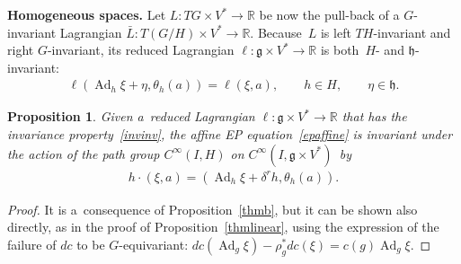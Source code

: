 \documentclass[pdftex]{sigma}
\numberwithin{equation}{section}
\newtheorem{Proposition}[Theorem]{Proposition}
{ \theoremstyle{definition}
\newtheorem{Example}[Theorem]{Example}
\newtheorem{Remark}[Theorem]{Remark} }
\begin{document}
{\bf Homogeneous spaces.} Let $L:TG\times V^*\to\mathbb R$ be now the pull-back of a $G$-invariant Lagrangian $\bar
L:T(G/H)\times V^*\to\mathbb R$.
Because~$L$ is left $TH$-invariant and right $G$-invariant, its reduced Lagrangian $\ell:\mathfrak g\times V^*\to\mathbb
R$ is both~$H$- and $\mathfrak h$-invariant:
\begin{gather}
\label{invinv}
\ell(\operatorname{Ad}_h\xi+\eta,\theta_{h}(a))=\ell(\xi,a),
\qquad
h\in H,
\qquad
\eta\in\mathfrak h.
\end{gather}

\begin{Proposition}
Given a~reduced Lagrangian $\ell:\mathfrak g\times V^*\to\mathbb R$ that has the invariance pro\-per\-ty~\eqref{invinv}, the
affine EP equation~\eqref{epaffine} is invariant under the action of the path group $C^{\infty}(I,H)$ on
$C^{\infty}(I,\mathfrak g\times V^*)$~by
\begin{gather}
\label{affact}
h\cdot (\xi,a)=(\operatorname{Ad}_h\xi+\delta^rh,\theta_{h}(a)).
\end{gather}
\end{Proposition}

\begin{proof}
It is a~consequence of Proposition~\ref{thmb}, but it can be shown also directly, as in the proof of
Proposition~\ref{thmlinear}, using the expression of the failure of $dc$ to be $G$-equivariant:
$dc(\operatorname{Ad}_g\xi)-\rho^*_gdc(\xi)=c(g)\operatorname{Ad}_g\xi$.
\end{proof}
\end{document}
